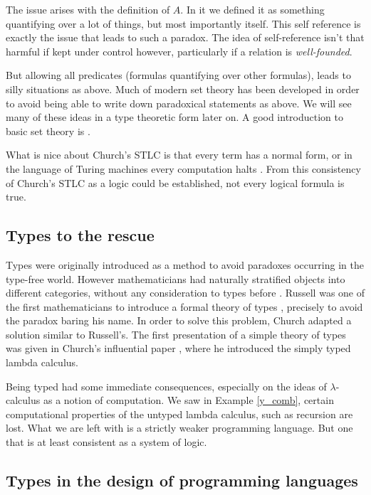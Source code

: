 The issue arises with the definition of $A$. In it we defined it as something quantifying over a lot of things, but most importantly itself. This self reference is exactly the issue that leads to such a paradox. The idea of self-reference isn't that harmful if kept under control however, particularly if a relation is \emph{well-founded}.

But allowing all predicates (formulas quantifying over other formulas), leads to silly situations as above. Much of modern set theory has been developed in order to avoid being able to write down paradoxical statements as above. We will see many of these ideas in a type theoretic form later on. A good introduction to basic set theory is \cite{johnstone1987notes}.


What is nice about Church's STLC is that every term has a normal form, or in the language of Turing machines every computation halts \cite{turing1936a}. From this consistency of Church's STLC as a logic could be established, not every logical formula is true.

\subsection{Types to the rescue}

Types were originally introduced as a method to avoid paradoxes occurring in the type-free world.
However mathematicians had naturally stratified objects into different categories, without any consideration to types before \cite{GANDY1977173, kamareddine2002}.
Russell was one of the first mathematicians to introduce a formal theory of types \cite{GlossarWiki:Whitehead_Russell:1910}, precisely to avoid the paradox baring his name.
In order to solve this problem, Church adapted a solution similar to Russell's.
The first presentation of a simple theory of types was given in Church's influential paper \cite{church1940}, where he introduced the simply typed lambda calculus.

Being typed had some immediate consequences, especially on the ideas of $\lambda$-calculus as a notion of computation. We saw in Example \ref{y_comb}, certain computational properties of the untyped lambda calculus, such as recursion are lost. What we are left with is a strictly weaker programming language. But one that is at least consistent as a system of logic.

\subsection{Types in the design of programming languages}




